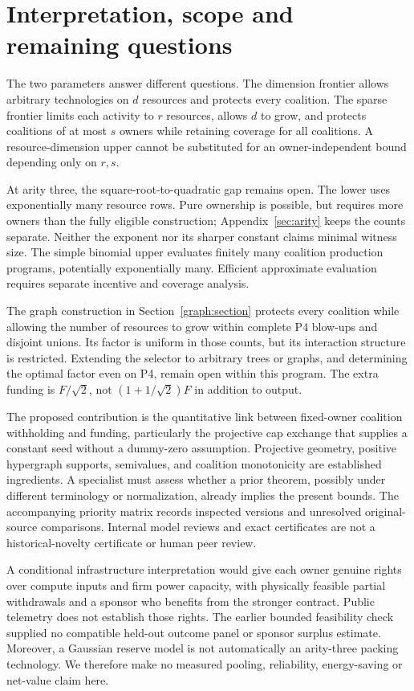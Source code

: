 \documentclass[11pt]{article}
\theoremstyle{definition}\newtheorem{definition}[theorem]{Definition}
\theoremstyle{remark}\newtheorem{remark}[theorem]{Remark}
\begin{document}
\section{Interpretation, scope and remaining questions}\label{sec:discussion}
The two parameters answer different questions. The dimension frontier allows
arbitrary technologies on $d$ resources and protects every coalition. The
sparse frontier limits each activity to $r$ resources, allows $d$ to grow,
and protects coalitions of at most $s$ owners while retaining coverage for all
coalitions. A resource-dimension upper cannot be substituted for an
owner-independent bound depending only on $r,s$.

At arity three, the square-root-to-quadratic gap remains open. The lower uses
exponentially many resource rows. Pure ownership is possible, but requires
more owners than the fully eligible construction; Appendix~\ref{sec:arity}
keeps the counts separate. Neither the exponent nor its sharper constant
claims minimal witness size. The simple binomial upper evaluates finitely
many coalition production programs, potentially exponentially many. Efficient
approximate evaluation requires separate incentive and coverage analysis.

The graph construction in Section~\ref{graph:section} protects every coalition
while allowing the number of resources to grow within complete P4 blow-ups and
disjoint unions. Its factor is uniform in those counts, but its interaction
structure is restricted. Extending the selector to arbitrary trees or graphs,
and determining the optimal factor even on P4, remain open within this program.
The extra funding is $F/\sqrt2$, not $(1+1/\sqrt2)F$ in addition to output.

The proposed contribution is the quantitative link between fixed-owner
coalition withholding and funding, particularly the projective cap exchange
that supplies a constant seed without a dummy-zero assumption. Projective
geometry, positive hypergraph supports, semivalues, and coalition monotonicity
are established ingredients. A specialist must assess whether a prior theorem,
possibly under different terminology or normalization, already implies the
present bounds. The accompanying priority matrix records inspected versions
and unresolved original-source comparisons. Internal model reviews and exact
certificates are not a historical-novelty certificate or human peer review.

A conditional infrastructure interpretation would give each owner genuine
rights over compute inputs and firm power capacity, with physically feasible
partial withdrawals and a sponsor who benefits from the stronger contract.
Public telemetry does not establish those rights. The earlier bounded
feasibility check supplied no compatible held-out outcome panel or sponsor
surplus estimate. Moreover, a Gaussian reserve model is not automatically an
arity-three packing technology. We therefore make no measured pooling,
reliability, energy-saving or net-value claim here.
\end{document}
